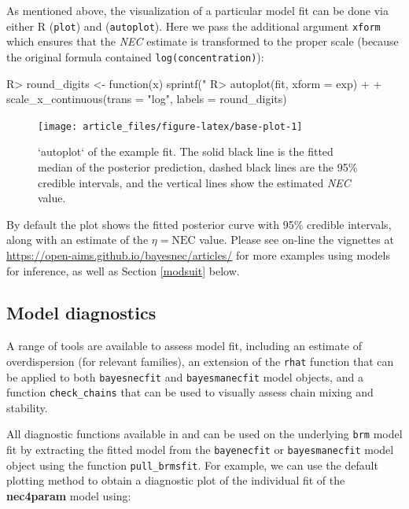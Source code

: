 \documentclass[
  shortnames]{jss}
\begin{document}
As mentioned above, the visualization of a particular model fit can be done via either  R (\texttt{plot}) and  (\texttt{autoplot}). Here we pass the additional argument \texttt{xform} which ensures that the \emph{NEC} estimate is transformed to the proper scale (because the original formula contained \texttt{log(concentration)}):

\newpage

\begin{CodeChunk}
\begin{CodeInput}
R> round_digits <- function(x) sprintf("%
R> autoplot(fit, xform = exp) +
+   scale_x_continuous(trans = "log", labels = round_digits)
\end{CodeInput}
\begin{figure}[!ht]

{\centering \texttt{[image: article\_files/figure-latex/base-plot-1]} 

}

\caption{ `autoplot` of the example fit. The solid black line is the fitted median of the posterior prediction, dashed black lines are the 95\% credible intervals, and the vertical lines show the estimated \textit{NEC} value.}\label{fig:base-plot}
\end{figure}
\end{CodeChunk}

By default the plot shows the fitted posterior curve with 95\% credible intervals, along with an estimate of the \(\eta = \text{NEC}\) value. Please see on-line the vignettes at \url{https://open-aims.github.io/bayesnec/articles/} for more examples using  models for inference, as well as Section \ref{modsuit} below.

\hypertarget{model-diagnostics}{%
\subsection{Model diagnostics}\label{model-diagnostics}}

A range of tools are available to assess model fit, including an estimate of overdispersion (for relevant families), an extension of the  \texttt{rhat} function that can be applied to both \texttt{bayesnecfit} and \texttt{bayesmanecfit} model objects, and a function \texttt{check\_chains} that can be used to visually assess chain mixing and stability.

All diagnostic functions available in  and  can be used on the underlying \texttt{brm} model fit by extracting the fitted  model from the \texttt{bayenecfit} or \texttt{bayesmanecfit} model object using the function \texttt{pull\_brmsfit}. For example, we can use the default  plotting method to obtain a diagnostic plot of the individual fit of the \textbf{nec4param} model using:
\end{document}
